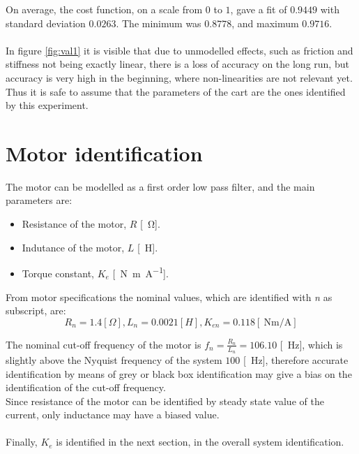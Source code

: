 On average, the cost function, on a scale from $0$ to $1$, gave a fit of $ 0.9449$ with standard deviation $0.0263$.
The minimum was $0.8778$, and maximum $ 0.9716$. \\ \\ 
In figure \ref{fig:val1} it is visible that due to unmodelled effects, such as friction and stiffness not being exactly linear, there is a loss of accuracy on the long run, but accuracy is very high in the beginning, where non-linearities are not relevant yet. Thus it is safe to assume that the parameters of the cart are the ones identified by this experiment.

\section{Motor identification}
\label{sec:motor_id}
The motor can be modelled as a first order low pass filter, and the main parameters are:
\begin{itemize}
\item Resistance of the motor, $R$ [\SI{}{\ohm}].
\item Indutance of the motor, $L$ [\SI{}{\henry}].
\item Torque constant, $K_e$ [\SI{}{\newton \metre \per \ampere}].
\end{itemize}
From motor specifications the nominal values, which are identified with \emph{n} as subscript, are:
$$R_n = 1.4 [\Omega], L_n = 0.0021 [H], K_{en} =0.118 [\SI{}{\newton\metre \per\ampere}]$$

The nominal cut-off frequency of the motor  is $f_n = 	\frac{R_n}{L_n} = 106.10$ [\SI{}{\hertz}], which is slightly above the Nyquist frequency of the system $100$ [\SI{}{\hertz}], therefore accurate identification by means of grey or black box identification may give a bias on the identification of the cut-off frequency. \\ Since resistance of the motor can be identified by  steady state value of the current, only inductance may have a biased value. \\ \\Finally, $K_e$ is identified in the next section, in the overall system identification.

